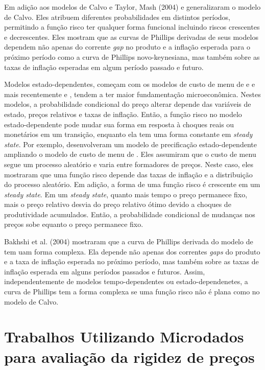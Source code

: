 \documentclass[twoside,a4paper,11pt]{report}
\begin{document}
Em adição aos modelos de Calvo e Taylor, Mash (2004) e \citet{coenen2007identifying} generalizaram o modelo de Calvo. Eles atribuem diferentes probabilidades em distintos períodos, permitindo a função risco ter qualquer forma funcional incluindo riscos crescentes e decrescentes. Eles mostram que as curvas de Phillips derivadas de seus modelos dependem não apenas do corrente \emph{gap} no produto e a inflação esperada para o próximo período como a curva de Phillips novo-keynesiana, mas também sobre as taxas de inflação esperadas em algum período passado e futuro. 

Modelos estado-dependentes, começam com os modelos de custo de menu de \citet{barro1972theory} e \citet{sheshinski1977inflation} e mais recentemente \citet{dotsey1999state} e \citet{golosov2007menu}, tendem a ter maior fundamentação microeconômica. Nestes modelos, a probabilidade condicional do preço alterar depende das variáveis de estado, preços relativos e taxas de inflação. Então, a função risco no modelo estado-dependente pode mudar sua forma em resposta à choques reais ou monetários em um transição, enquanto ela tem uma forma constante em \emph{steady state}. Por exemplo, \citet{dotsey1999state} desenvolveram um modelo de precificação estado-dependente ampliando o modelo de custo de menu de \citet{blanchard1987monopolistic}. Eles assumiram que o custo de menu segue um processo aleatório e varia entre formadores de preços. Neste caso, eles mostraram que uma função risco depende das taxas de inflação e a distribuição do processo aleatório. Em adição, a forma de uma função risco é crescente em um \emph{steady state}. Em um \emph{steady state}, quanto mais tempo o preço permanece fixo, mais o preço relativo desvia do preço relativo ótimo devido a choques de produtividade acumulados. Então, a probabilidade condicional de mudanças nos preços sobe equanto o preço permanece fixo. 

Bakhshi et al. (2004) mostraram que a curva de Phillips derivada do modelo de \citet{dotsey1999state} tem uam forma complexa. Ela depende não apenas dos correntes \emph{gaps} do produto e a taxa de inflação esperada no próximo período, mas também sobre as taxas de inflação esperada em alguns períodos passados e futuros. Assim, independentemente de modelos tempo-dependentes ou estado-dependenetes, a curva de Phillips tem a forma complexa se uma função risco não é plana como no modelo de Calvo.

\section*{Trabalhos Utilizando Microdados para avaliação da rigidez de preços}
\end{document}
